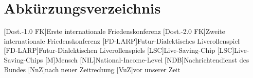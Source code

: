 \newpage
\thispagestyle{plain}
\chapter*{Abkürzungsverzeichnis}
\begin{acronym}
	[Dost.-1.0 FK]{Erste internationale Friedenskonferenz}
	[Dost.-2.0 FK]{Zweite internationale Friedenskonferenz}
	[FD-LARP]{Futur-Dialektisches Liverollenspiel}
	[FD-LARP]{Futur-Dialektischen Liverollenspiels}
	[LSC]{Live-Saving-Chip}
	[LSC]{Live-Saving-Chips}
	{Mensch}
	[NIL]{National-Income-Level}
	[NDB]{Nach\-rich\-ten\-dienst des Bundes}
	[NnZ]{nach neuer Zeitrechung}
	[VuZ]{vor unserer Zeit}
\end{acronym}


